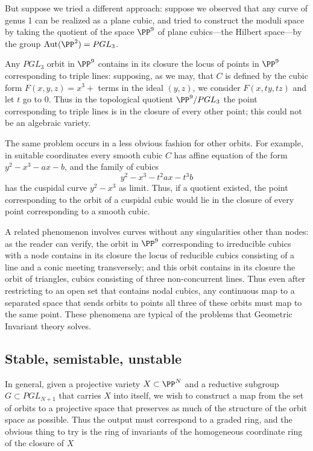 But suppose we tried a different approach: suppose we observed that any curve of genus 1 can be realized as a plane cubic, and tried to construct the moduli space by taking the quotient of the space $\PP^9$ of plane cubics---the Hilbert space---by the group ${\rm Aut}(\PP^2) = PGL_3$. 

Any $PGL_3$ orbit in $\PP^9$ contains in its closure the locus of points in $\PP^9$ corresponding to triple lines: supposing, as we may, that $C$ is defined by the cubic form $F(x,y,z) = x^3+$ terms in the ideal $(y,z)$,
we consider $F(x,ty, tz)$ and let $t$ go to 0. Thus in the topological quotient $\PP^9/PGL_3$ the point corresponding to triple lines is in the closure of every other point; this could not be an algebraic variety.

The same problem occurs in a less obvious fashion for other orbits. For example, in suitable coordinates every smooth cubic $C$ has affine equation of the form $y^2-x^3 - ax - b$, and the family of cubics
$$
y^2 - x^3 - t^2ax - t^3b
$$
has the cuspidal curve $y^2-x^3$ as limit.
Thus, if a quotient existed, the point corresponding to the orbit of a cuspidal cubic would lie in the closure of every point corresponding to a smooth cubic. 

A related phenomenon involves curves without any singularities other than nodes: as the reader can verify, the orbit in $\PP^9$ corresponding to irreducible cubics with a node contains in its closure the locus of reducible cubics consisting of a line and a conic meeting transversely; and this orbit contains in its closure the orbit of triangles, cubics consisting of three non-concurrent lines. Thus even after restricting to an open set that contains nodal cubics, any continuous map 
to a separated space that sends orbits to points all three of these orbits must map to the same point.
These phenomena are typical of the problems that Geometric Invariant theory solves.

\subsection{Stable, semistable, unstable}

In general, given a projective variety $X \subset \PP^N$ and a reductive subgroup $G \subset PGL_{N+1}$ that carries $X$ into itself, we wish to construct a map from the set of orbits
to a projective space that preserves as much of the structure of the orbit space as possible. Thus
the output must correspond to a graded ring, and the obvious thing to try is the ring of invariants
of the homogeneous coordinate ring of the closure of $X$

